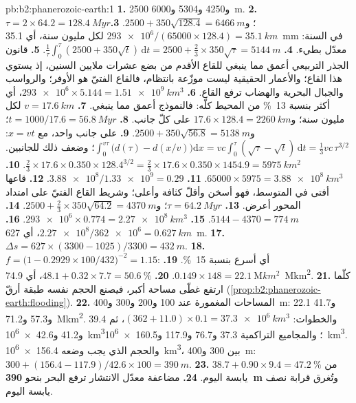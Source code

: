 \begin{solution}{pb:b2:phanerozoic-earth:1}
\textbf{1.} 2500 و4250 و5304 و\qty{6000}{m}.
\textbf{2.} $\tau = 2 \times 64.2 = \qty{128.4}{Myr}$؛ و$2500 + 350\sqrt{128.4} = \qty{6466}{m}$.
\textbf{3.} $\num{293e6}/(65000 \times 128.4) = \qty{35.1}{km}$ لكل مليون سنة،
أي \qty{35.1}{mm} في السنة: معدّل بطيء.
\textbf{4.} $\frac1\tau\int_0^\tau(2500 + 350\sqrt t)\,\mathrm{d}t = 2500 + \frac23 \times
350\sqrt\tau = \qty{5144}{m}$.
\textbf{5.} قانون الجذر التربيعي أعمق مما ينبغي للقاع الأقدم من بضع عشرات ملايين السنين،
إذ يستوي هذا القاع؛ والأعمار الحقيقية ليست موزّعة بانتظام، فالقاع الفتيّ هو الأوفر؛
والرواسب والجبال البحرية والهضاب ترفع القاع.
\textbf{6.} $\num{293e6} \times 5.144 = \qty{1.51e9}{km^3}$، أي أكثر بنسبة \qty{13}{\percent} من
المحيط كلّه: فالنموذج أعمق مما ينبغي.
\textbf{7.} $v = \qty{17.6}{km}$ لكل مليون سنة؛ و$17.6 \times 128.4 = \qty{2260}{km}$ على
كلّ جانب.
\textbf{8.} $t = 1000/17.6 = \qty{56.8}{Myr}$؛ و$2500 + 350\sqrt{56.8} = \qty{5138}{m}$.
\textbf{9.} على جانب واحد، مع $x = vt$: $\int_0^{v\tau}\bigl(d(\tau) - d(x/v)\bigr)\mathrm{d}x
= vc\int_0^\tau(\sqrt\tau - \sqrt t)\,\mathrm{d}t = \frac13 vc\,\tau^{3/2}$؛ وضعف ذلك للجانبين.
$\frac23 \times 17.6 \times 0.350 \times 128.4^{3/2} = \frac23 \times 17.6 \times 0.350 \times
1454.9 = \qty{5975}{km^2}$.
\textbf{10.} $65000 \times 5975 = \qty{3.88e8}{km^3}$.
\textbf{11.} $\num{3.88e8}/\num{1.33e9} = 0.29$.
\textbf{12.} قاعها أفتى في المتوسط، فهو أسخن وأقلّ كثافة وأعلى؛ وشريط القاع الفتيّ
على امتداد المحور أعرض.
\textbf{13.} $\tau = \qty{64.2}{Myr}$؛ و$2500 + \frac23 \times 350\sqrt{64.2} = \qty{4370}{m}$.
\textbf{14.} $5144 - 4370 = \qty{774}{m}$.
\textbf{15.} $\num{293e6} \times 0.774 = \qty{2.27e8}{km^3}$.
\textbf{16.} $\num{2.27e8}/\num{362e6} = \qty{0.627}{km}$، أي \qty{627}{m}.
\textbf{17.} $\Delta s = 627 \times (3300 - 1025)/3300 = \qty{432}{m}$.
\textbf{18.} $f = \bigl(1 - 0.2929 \times 100/432\bigr)^{-2} = 1.15$: أي أسرع بنسبة \qty{15}{\percent}.
\textbf{19.} $0.149 \times 148 = \qty{22.1}{\mega km^2}$.
\textbf{20.} $48.1 + 0.32 \times 7.7 = \qty{50.6}{\percent}$، أي \qty{74.9}{\mega km^2}.
\textbf{21.} كلّما ارتفع غطّى مساحة أكبر، فيصنع الحجم نفسه طبقة أرقّ
(\cref{prop:b2:phanerozoic-earth:flooding}).
\textbf{22.} المساحات المغمورة عند 100 و200 و300 و\qty{400}{m}: 22.1 و41.7 و57.3
و\qty{71.2}{\mega km^2}. والخطوات: $(362 + 11.0) \times 0.1 = \qty{37.3e6}{km^3}$، ثم 39.4 و41.2
و\qty{42.6e6}{km^3}؛ والمجاميع التراكمية 37.3 و76.7 و117.9 و\qty{160.5e6}{km^3}. والحجم الذي يجب وضعه
\qty{156.4e6}{km^3}، بين 300 و\qty{400}{m}: $300 + (156.4 - 117.9)/42.6 \times 100
= \qty{390}{m}$.
\textbf{23.} $38.7 + 0.90 \times 9.4 = \qty{47.2}{\percent}$ من يابسة اليوم.
\textbf{24.} مضاعفة معدّل الانتشار ترفع البحر بنحو \textbf{\qty{390}{m}}
وتُغرق قرابة نصف يابسة اليوم.
\end{solution}
